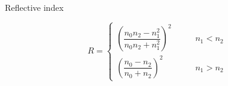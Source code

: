 Reflective index

\begin{equation*}
  R = \left\{
  \begin{aligned}
    \left( \dfrac{n_0 n_2 - n_1^2}{n_0 n_2 + n_1^2}  \right)^2 & \quad\quad n_1 < n_2 \\
    \left( \dfrac{n_0 - n_2}{n_0 + n_2}  \right)^2 & \quad\quad n_1 > n_2 
  \end{aligned}
  \right.
\end{equation*}

